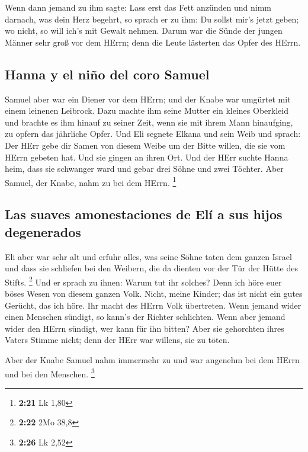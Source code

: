  Wenn dann jemand zu ihm sagte: Lass erst das Fett
anzünden und nimm darnach, was dein Herz begehrt, so sprach er zu ihm:
Du sollst mir's jetzt geben; wo nicht, so will ich's mit Gewalt nehmen.
 Darum war die Sünde der jungen Männer sehr groß vor dem
HErrn; denn die Leute lästerten das Opfer des HErrn.

\hypertarget{hanna-y-el-niuxf1o-del-coro-samuel}{%
\subsection{Hanna y el niño del coro
Samuel}\label{hanna-y-el-niuxf1o-del-coro-samuel}}

 Samuel aber war ein Diener vor dem HErrn; und der Knabe
war umgürtet mit einem leinenen Leibrock.  Dazu machte
ihm seine Mutter ein kleines Oberkleid und brachte es ihm hinauf zu
seiner Zeit, wenn sie mit ihrem Mann hinaufging, zu opfern das jährliche
Opfer.  Und Eli segnete Elkana und sein Weib und sprach:
Der HErr gebe dir Samen von diesem Weibe um der Bitte willen, die sie
vom HErrn gebeten hat. Und sie gingen an ihren Ort.  Und
der HErr suchte Hanna heim, dass sie schwanger ward und gebar drei Söhne
und zwei Töchter. Aber Samuel, der Knabe, nahm zu bei dem HErrn.
\footnote{\textbf{2:21} Lk 1,80}

\hypertarget{las-suaves-amonestaciones-de-eluxed-a-sus-hijos-degenerados}{%
\subsection{Las suaves amonestaciones de Elí a sus hijos
degenerados}\label{las-suaves-amonestaciones-de-eluxed-a-sus-hijos-degenerados}}

 Eli aber war sehr alt und erfuhr alles, was seine Söhne
taten dem ganzen Israel und dass sie schliefen bei den Weibern, die da
dienten vor der Tür der Hütte des Stifts. \footnote{\textbf{2:22} 2Mo
  38,8}  Und er sprach zu ihnen: Warum tut ihr solches?
Denn ich höre euer böses Wesen von diesem ganzen Volk. 
Nicht, meine Kinder; das ist nicht ein gutes Gerücht, das ich höre. Ihr
macht des HErrn Volk übertreten.  Wenn jemand wider einen
Menschen sündigt, so kann's der Richter schlichten. Wenn aber jemand
wider den HErrn sündigt, wer kann für ihn bitten? Aber sie gehorchten
ihres Vaters Stimme nicht; denn der HErr war willens, sie zu töten.

 Aber der Knabe Samuel nahm immermehr zu und war angenehm
bei dem HErrn und bei den Menschen. \footnote{\textbf{2:26} Lk 2,52}

